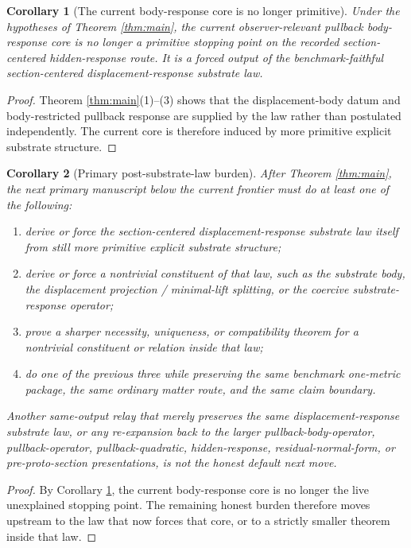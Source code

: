 \documentclass[11pt]{article}
\newtheorem{corollary}{Corollary}
\begin{document}
\begin{corollary}[The current body-response core is no longer primitive]
\label{cor:nonprimitive}
Under the hypotheses of Theorem \ref{thm:main}, the current observer-relevant pullback body-response core is no longer a primitive stopping point on the recorded section-centered hidden-response route. It is a forced output of the benchmark-faithful section-centered displacement-response substrate law.
\end{corollary}

\begin{proof}
Theorem \ref{thm:main}(1)--(3) shows that the displacement-body datum and body-restricted pullback response are supplied by the law rather than postulated independently. The current core is therefore induced by more primitive explicit substrate structure.
\end{proof}

\begin{corollary}[Primary post-substrate-law burden]
\label{cor:next}
After Theorem \ref{thm:main}, the next primary manuscript below the current frontier must do at least one of the following:
\begin{enumerate}
    \item derive or force the section-centered displacement-response substrate law itself from still more primitive explicit substrate structure;
    \item derive or force a nontrivial constituent of that law, such as the substrate body, the displacement projection / minimal-lift splitting, or the coercive substrate-response operator;
    \item prove a sharper necessity, uniqueness, or compatibility theorem for a nontrivial constituent or relation inside that law;
    \item do one of the previous three while preserving the same benchmark one-metric package, the same ordinary matter route, and the same claim boundary.
\end{enumerate}
Another same-output relay that merely preserves the same displacement-response substrate law, or any re-expansion back to the larger pullback-body-operator, pullback-operator, pullback-quadratic, hidden-response, residual-normal-form, or pre-proto-section presentations, is not the honest default next move.
\end{corollary}

\begin{proof}
By Corollary \ref{cor:nonprimitive}, the current body-response core is no longer the live unexplained stopping point. The remaining honest burden therefore moves upstream to the law that now forces that core, or to a strictly smaller theorem inside that law.
\end{proof}
\end{document}
